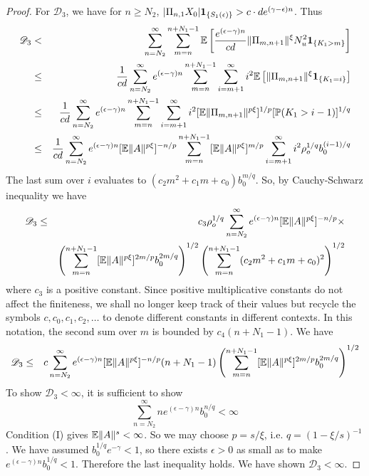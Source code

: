 \begin{proof}
For $\mathscr D_3$, we have for $n \geq N_2$,
$|\Pi_{n, 1} X_0| \mathbf{1}_{\{S_1(\epsilon)\}} > c \cdot d e^{(\gamma - \epsilon) n}$.
Thus
\begin{eqnarray*}
  \mathscr D_3
  &<&
  \sum_{n=N_2}^\infty \sum_{m=n}^{n + N_1 - 1}
  \mathbb{E} \left[
    {
      e^{(\epsilon - \gamma) n}
      \over
      cd
    } \|\Pi_{m, n+1}\|^\xi
    N_u^2
    \mathbf{1}_{\{K_1 > m\}}
    \right] \\
  &\leq&
  \frac{1}{cd}
  \sum_{n=N_2}^\infty
  e^{(\epsilon - \gamma) n}
  \sum_{m=n}^{n + N_1 - 1}
  \sum_{i=m+1}^\infty
  i^2
  \mathbb{E} \left[
    \|\Pi_{m, n+1}\|^\xi
    \mathbf{1}_{\{K_1 = i\}}
    \right] \\
  &\leq&
  \frac{1}{cd}
  \sum_{n=N_2}^\infty
  e^{(\epsilon - \gamma) n}
  \sum_{m=n}^{n + N_1 - 1}
  \sum_{i=m+1}^\infty
  i^2
  [\mathbb{E}  \|\Pi_{m, n+1}\|^{p \xi}]^{1/p}
  [\mathbb{P}(K_1 > i-1)]^{1/q} \\
  &\leq&
  \frac{1}{cd}
  \sum_{n=N_2}^\infty
  e^{(\epsilon - \gamma) n}
  [\mathbb{E} \|A\|^{p \xi}]^{-n/p}
  \sum_{m=n}^{n + N_1 - 1}
   [\mathbb{E}  \|A\|^{p \xi}]^{m/p}
  \sum_{i=m+1}^\infty
  i^2 \rho_o^{1/q} b_0^{(i-1)/q}
\end{eqnarray*}
The last sum over $i$ evaluates to
$(c_2 m^2 + c_1 m + c_0) b_0^{m/q}$. So, by Cauchy-Schwarz inequality
we have
\begin{eqnarray*}
  \mathscr D_3
  &\leq&
  c_3 \rho_o^{1/q}
  \sum_{n=N_2}^\infty
  e^{(\epsilon - \gamma) n}
  [\mathbb{E} \|A\|^{p \xi}]^{-n/p} \times \\
  &&
  \left(
  \sum_{m=n}^{n + N_1 - 1}
      [\mathbb{E}  \|A\|^{p \xi}]^{2m/p}
      b_0^{2m/q}
 \right)^{1/2}
 \left(      
 \sum_{m=n}^{n + N_1 - 1}
 (c_2 m^2 + c_1 m + c_0)^2
  \right)^{1/2}
\end{eqnarray*}
where $c_3$ is a positive constant. Since positive multiplicative
constants do not affect the finiteness, we shall no longer keep
track of their values but recycle the symbols $c, c_0, c_1, c_2, \dots$
to denote different constants in different contexts. In this notation,
the second sum over $m$ is bounded by $c_4 (n + N_1 -1)$. We have
\begin{eqnarray*}
  \mathscr D_3
  &\leq&
  c \sum_{n=N_2}^\infty
  e^{(\epsilon - \gamma) n}
  [\mathbb{E} \|A\|^{p \xi}]^{-n/p}
  (n + N_1 - 1)
  \left(
  \sum_{m=n}^{n + N_1 - 1}
      [\mathbb{E}  \|A\|^{p \xi}]^{2m/p}
      b_0^{2m/q}
 \right)^{1/2}
\end{eqnarray*}
To show $\mathscr D_3 < \infty$, it is sufficient to show
\[
\sum_{n=N_2}^\infty
n e^{(\epsilon - \gamma) n}
b_0^{n/q}
< \infty
\]
Condition (I) gives $\mathbb{E} \|A\|^{s} < \infty$. So we may choose
$p = s/\xi$, i.e. $q = (1 - \xi/s)^{-1}$. We have assumed
$b_0^{1/q}  e^{-\gamma} < 1$, so there exists $\epsilon > 0$
as small as to make $e^{(\epsilon - \gamma) n} b_0^{1/q} < 1$.
Therefore the last inequality holds. We have shown
$\mathscr D_3 < \infty$.


\end{proof}
